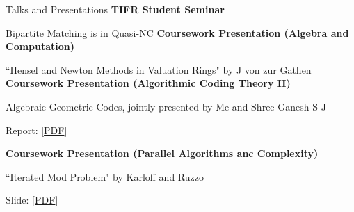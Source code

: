 \begin{rubric}{Talks and Presentations}
\entry*[2025]%
	\textbf{TIFR Student Seminar}

    Bipartite Matching is in \textsf{Quasi-NC}
%
%
\entry*[2024]%
	\textbf{Coursework Presentation (Algebra and Computation)}

    ``Hensel and Newton Methods in Valuation Rings" by J von zur Gathen
%
%
\entry*[2023]%
	\textbf{Coursework Presentation (Algorithmic Coding Theory II)}

    Algebraic Geometric Codes, jointly presented by Me and Shree Ganesh S J

    Report: [\href{https://sohamch08.github.io/assets/act-report.pdf}{PDF}]

\entry*[2023]%
	\textbf{Coursework Presentation (Parallel Algorithms anc Complexity)}

    ``Iterated Mod Problem" by Karloff and Ruzzo

    Slide: [\href{https://sohamch08.github.io/assets/parallel-presentation-iterated-mod.pdf}{PDF}]
%
\end{rubric}